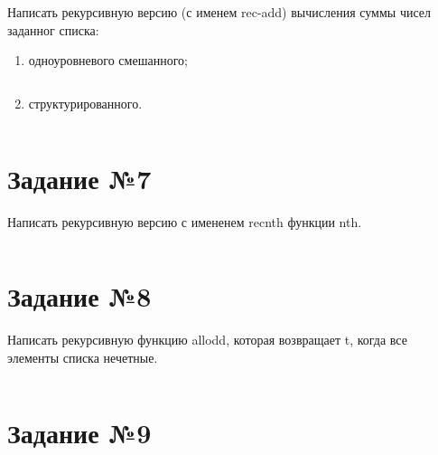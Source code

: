 Написать рекурсивную версию (с именем rec-add) вычисления суммы чисел
заданног списка: 
\begin{enumerate}
    \item одноуровневого смешанного;

\vspace{4mm}
\begin{minipage}{0.92\linewidth}
\begin{lstlisting}
\end{lstlisting}
\end{minipage}

    \item структурированного.

\vspace{4mm}
\begin{minipage}{0.92\linewidth}
\begin{lstlisting}
\end{lstlisting}
\end{minipage}

\end{enumerate}

\section{Задание №7}

Написать рекурсивную версию с имененем recnth функции nth.

\vspace{4mm}
\begin{minipage}{0.92\linewidth}
\begin{lstlisting}
\end{lstlisting}
\end{minipage}

\section{Задание №8}

Написать рекурсивную функцию allodd, которая возвращает t, когда все элементы
списка нечетные.

\vspace{4mm}
\begin{minipage}{0.92\linewidth}
\begin{lstlisting}
\end{lstlisting}
\end{minipage}

\section{Задание №9}

